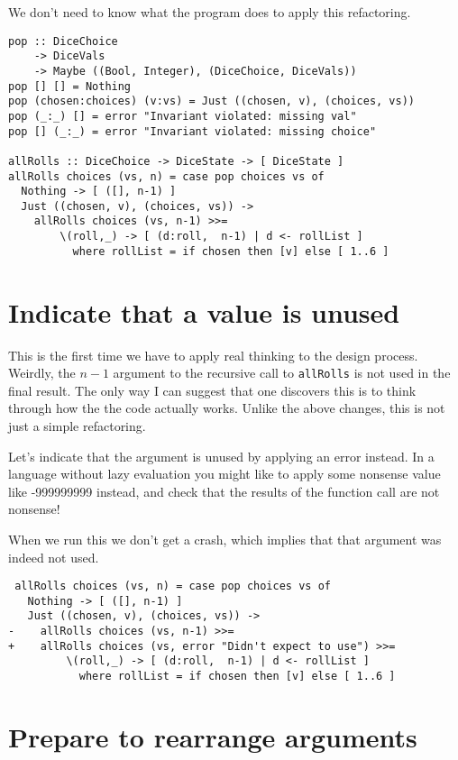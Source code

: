 We don't need to know what the program does to apply this refactoring.

\begin{verbatim}
pop :: DiceChoice
    -> DiceVals
    -> Maybe ((Bool, Integer), (DiceChoice, DiceVals))
pop [] [] = Nothing
pop (chosen:choices) (v:vs) = Just ((chosen, v), (choices, vs))
pop (_:_) [] = error "Invariant violated: missing val"
pop [] (_:_) = error "Invariant violated: missing choice"

allRolls :: DiceChoice -> DiceState -> [ DiceState ]
allRolls choices (vs, n) = case pop choices vs of
  Nothing -> [ ([], n-1) ]
  Just ((chosen, v), (choices, vs)) ->
    allRolls choices (vs, n-1) >>=
        \(roll,_) -> [ (d:roll,  n-1) | d <- rollList ]
          where rollList = if chosen then [v] else [ 1..6 ]
\end{verbatim}


\section{Indicate that a value is unused}


This is the first time we have to apply real thinking to the design process. Weirdly, the $n-1$ argument to the recursive call to \texttt{allRolls} is not used in the final result. The only way I can suggest that one discovers this is to think through how the the code actually works. Unlike the above changes, this is not just a simple refactoring.

Let's indicate that the argument is unused by applying an error instead. In a language without lazy evaluation you might like to apply some nonsense value like -999999999 instead, and check that the results of the function call are not nonsense!

When we run this we don't get a crash, which implies that that argument was indeed not used.

\begin{verbatim}
 allRolls choices (vs, n) = case pop choices vs of
   Nothing -> [ ([], n-1) ]
   Just ((chosen, v), (choices, vs)) ->
-    allRolls choices (vs, n-1) >>=
+    allRolls choices (vs, error "Didn't expect to use") >>=
         \(roll,_) -> [ (d:roll,  n-1) | d <- rollList ]
           where rollList = if chosen then [v] else [ 1..6 ]
\end{verbatim}
           
\section{Prepare to rearrange arguments}


